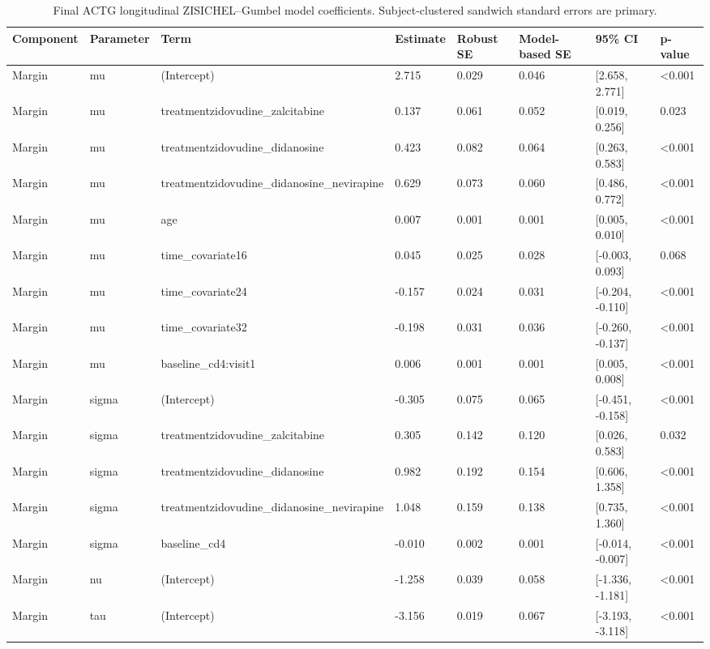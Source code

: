 \begin{table}

\caption{Final ACTG longitudinal ZISICHEL--Gumbel model coefficients. Subject-clustered sandwich standard errors are primary.}
\centering
\begin{tabular}[t]{llllllll}
\toprule
Component & Parameter & Term & Estimate & Robust SE & Model-based SE & 95\% CI & p-value\\
\midrule
Margin & mu & (Intercept) & 2.715 & 0.029 & 0.046 & {}[2.658, 2.771] & <0.001\\
Margin & mu & treatmentzidovudine\_zalcitabine & 0.137 & 0.061 & 0.052 & {}[0.019, 0.256] & 0.023\\
Margin & mu & treatmentzidovudine\_didanosine & 0.423 & 0.082 & 0.064 & {}[0.263, 0.583] & <0.001\\
Margin & mu & treatmentzidovudine\_didanosine\_nevirapine & 0.629 & 0.073 & 0.060 & {}[0.486, 0.772] & <0.001\\
Margin & mu & age & 0.007 & 0.001 & 0.001 & {}[0.005, 0.010] & <0.001\\
\addlinespace
Margin & mu & time\_covariate16 & 0.045 & 0.025 & 0.028 & {}[-0.003, 0.093] & 0.068\\
Margin & mu & time\_covariate24 & -0.157 & 0.024 & 0.031 & {}[-0.204, -0.110] & <0.001\\
Margin & mu & time\_covariate32 & -0.198 & 0.031 & 0.036 & {}[-0.260, -0.137] & <0.001\\
Margin & mu & baseline\_cd4:visit1 & 0.006 & 0.001 & 0.001 & {}[0.005, 0.008] & <0.001\\
Margin & sigma & (Intercept) & -0.305 & 0.075 & 0.065 & {}[-0.451, -0.158] & <0.001\\
\addlinespace
Margin & sigma & treatmentzidovudine\_zalcitabine & 0.305 & 0.142 & 0.120 & {}[0.026, 0.583] & 0.032\\
Margin & sigma & treatmentzidovudine\_didanosine & 0.982 & 0.192 & 0.154 & {}[0.606, 1.358] & <0.001\\
Margin & sigma & treatmentzidovudine\_didanosine\_nevirapine & 1.048 & 0.159 & 0.138 & {}[0.735, 1.360] & <0.001\\
Margin & sigma & baseline\_cd4 & -0.010 & 0.002 & 0.001 & {}[-0.014, -0.007] & <0.001\\
Margin & nu & (Intercept) & -1.258 & 0.039 & 0.058 & {}[-1.336, -1.181] & <0.001\\
\addlinespace
Margin & tau & (Intercept) & -3.156 & 0.019 & 0.067 & {}[-3.193, -3.118] & <0.001\\

\end{tabular}
\end{table}
